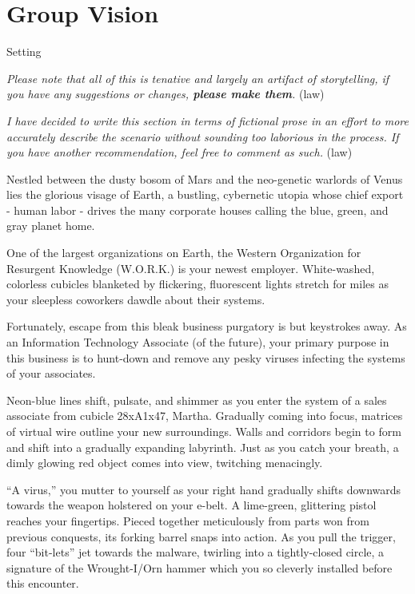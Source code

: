 \documentclass[12pt]{report}
\begin{document}
\chapter{Group Vision}


\begin{section}{Setting}

\emph{Please note that all of this is tenative and largely an artifact of storytelling, 
if you have any suggestions or changes, \textbf{please make them}.}
\newline(law)
\newline

\noindent \emph{I have decided to write this section in terms of fictional prose in an 
effort to more accurately describe the scenario without sounding too laborious in the 
process. If you have another recommendation, feel free to comment as such.}
\newline(law)
\newline

Nestled between the dusty bosom of Mars and the neo-genetic warlords of Venus lies the 
glorious visage of Earth, a bustling, cybernetic utopia whose chief export - human labor 
- drives the many corporate houses calling the blue, green, and gray planet home.

One of the largest organizations on Earth, the Western Organization for Resurgent 
Knowledge (W.O.R.K.) is your newest employer. White-washed, colorless cubicles blanketed 
by flickering, fluorescent lights stretch for miles as your sleepless coworkers dawdle 
about their systems.

Fortunately, escape from this bleak business purgatory is but keystrokes away. As an 
Information Technology Associate (of the future), your primary purpose in this business 
is to hunt-down and remove any pesky viruses infecting the systems of your associates.
\newline

Neon-blue lines shift, pulsate, and shimmer as you enter the system of a sales associate 
from cubicle 28xA1x47, Martha. Gradually coming into focus, matrices of virtual wire 
outline your new surroundings. Walls and corridors begin to form and shift into a gradually 
expanding labyrinth. Just as you catch your breath, a dimly glowing red object comes into 
view, twitching menacingly.

``A virus,'' you mutter to yourself as your right hand gradually shifts downwards towards 
the weapon holstered on your e-belt. A lime-green, glittering pistol reaches your 
fingertips. Pieced together meticulously from parts won from previous conquests, its forking 
barrel snaps into action. As you pull the trigger, four ``bit-lets'' jet towards the malware, 
twirling into a tightly-closed circle, a signature of the Wrought-I/Orn hammer which you so 
cleverly installed before this encounter.


\end{section}
\end{document}
